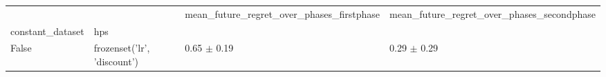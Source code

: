 \begin{tabular}{llll}
\toprule
 &  & mean_future_regret_over_phases_firstphase & mean_future_regret_over_phases_secondphase \\
constant_dataset & hps &  &  \\
\midrule
False & frozenset({'lr', 'discount'}) & 0.65 $\pm$ 0.19 & 0.29 $\pm$ 0.29 \\
\cline{1-4}
\bottomrule
\end{tabular}
